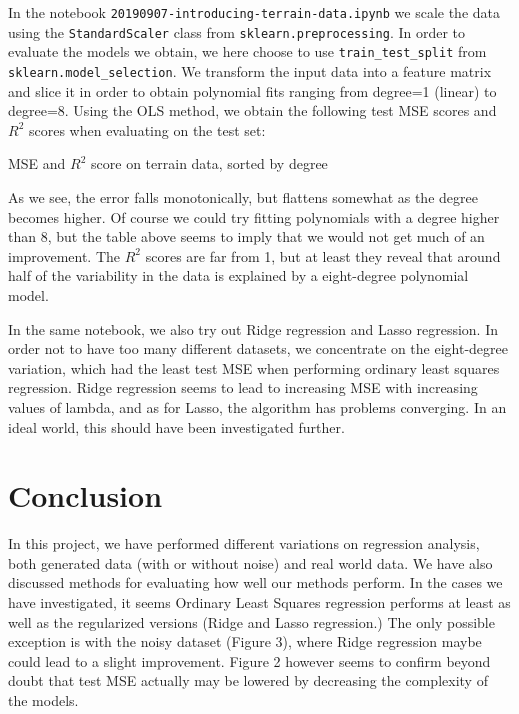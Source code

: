 \documentclass{article}
\begin{document}
In the notebook \texttt{20190907-introducing-terrain-data.ipynb} we scale the data using the \texttt{StandardScaler} class from \texttt{sklearn.preprocessing}. In order to evaluate the models we obtain, we here choose to use \texttt{train\_test\_split} from \texttt{sklearn.model\_selection}. We transform the input data into a feature matrix and slice it in order to obtain polynomial fits ranging from degree=1 (linear) to degree=8. Using the OLS method, we obtain the following test MSE scores and $R^2$ scores when evaluating on the test set:

\begin{table}[h!]
    \caption{MSE and $R^2$ score on terrain data, sorted by degree}
\end{table}

As we see, the error falls monotonically, but flattens somewhat as the degree becomes higher. Of course we could try fitting polynomials with a degree higher than 8, but the table above seems to imply that we would not get much of an improvement. The $R^2$ scores are far from 1, but at least they reveal that around half of the variability in the data is explained by a eight-degree polynomial model.

In the same notebook, we also try out Ridge regression and Lasso regression. In order not to have too many different datasets, we concentrate on the eight-degree variation, which had the least test MSE when performing ordinary least squares regression. Ridge regression seems to lead to increasing MSE with increasing values of lambda, and as for Lasso, the algorithm has problems converging. In an ideal world, this should have been investigated further.

\section*{Conclusion}
In this project, we have performed different variations on regression analysis, both generated data (with or without noise) and real world data. We have also discussed methods for evaluating how well our methods perform. In the cases we have investigated, it seems Ordinary Least Squares regression performs at least as well as the regularized versions (Ridge and Lasso regression.) The only possible exception is with the noisy dataset (Figure 3), where Ridge regression maybe could lead to a slight improvement. Figure 2 however seems to confirm beyond doubt that test MSE actually may be lowered by decreasing the complexity of the models.
\end{document}
